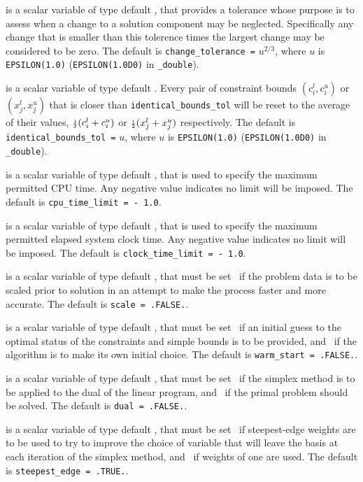 \begin{description}
 is a scalar variable of type default \realdp, that
provides a tolerance whose purpose is to assess when a
change to a solution component may be neglected. Specifically
any change that is smaller than this tolerence times the
largest change may be considered to be zero.
The default is {\tt change\_tolerance =} $u^{2/3}$,
where $u$ is {\tt EPSILON(1.0)} ({\tt EPSILON(1.0D0)} in
{\tt \fullpackagename\_double}).

is a scalar variable of type default \realdp.
Every pair of constraint bounds
$(c_{i}^{l}, c_{i}^{u})$ or $(x_{j}^{l}, x_{j}^{u})$
that is closer than {\tt identical\_bounds\_tol}
will be reset to the average of their values,
${\scriptstyle \frac{1}{2}} (c_{i}^{l} + c_{i}^{u})$ or ${\scriptstyle \frac{1}{2}} (x_{j}^{l} + x_{j}^{u})$
respectively.
The default is {\tt identical\_bounds\_tol =} $u$,
where $u$ is {\tt EPSILON(1.0)} ({\tt EPSILON(1.0D0)} in
{\tt \fullpackagename\_double}).

 is a scalar variable of type default \realdp,
that is used to specify the maximum permitted CPU time. Any negative
value indicates no limit will be imposed. The default is
{\tt cpu\_time\_limit = - 1.0}.

 is a scalar variable of type default \realdp,
that is used to specify the maximum permitted elapsed system clock time.
Any negative value indicates no limit will be imposed. The default is
{\tt clock\_time\_limit = - 1.0}.

 is a scalar variable of type
default \logical, that must be set \true\ if the problem data
is to be scaled prior to solution in an attempt to make the
process faster and more accurate.
The default is {\tt scale = .FALSE.}.

 is a scalar variable of type default \logical,
that must be set \true\ if an initial guess to the optimal
status of the constraints and simple bounds is to be provided,
and  \false\ if the algorithm is to make its own initial choice.
The default is {\tt warm\_start = .FALSE.}.

 is a scalar variable of type default \logical,
that must be set \true\ if the simplex method is to be applied to
the dual of the linear program,
and  \false\ if the primal problem should be solved.
The default is {\tt dual = .FALSE.}.

 is a scalar variable of type default \logical,
that must be set \true\ if steepest-edge weights are to be used to
try to improve the choice of variable that will leave the basis at
each iteration of the simplex method,
and  \false\ if weights of one are used.
The default is {\tt steepest\_edge = .TRUE.}.


\end{description}
